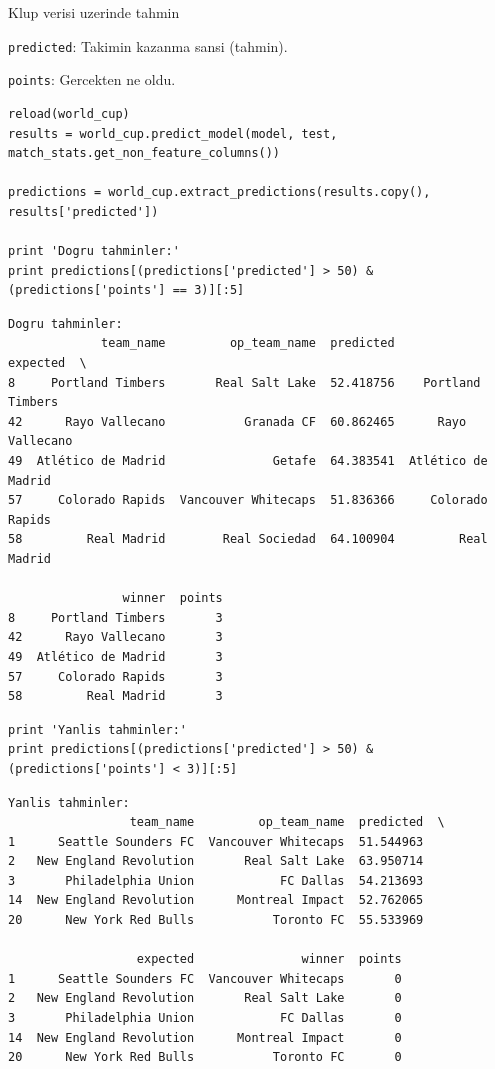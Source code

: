 \documentclass[12pt,fleqn]{article}\usepackage{../common}
\begin{document}
Klup verisi uzerinde tahmin

\verb!predicted!: Takimin kazanma sansi (tahmin).

\verb!points!: Gercekten ne oldu.

\begin{verbatim}
reload(world_cup)
results = world_cup.predict_model(model, test, match_stats.get_non_feature_columns())

predictions = world_cup.extract_predictions(results.copy(), results['predicted'])

print 'Dogru tahminler:'
print predictions[(predictions['predicted'] > 50) & (predictions['points'] == 3)][:5]
\end{verbatim}

\begin{verbatim}
Dogru tahminler:
             team_name         op_team_name  predicted            expected  \
8     Portland Timbers       Real Salt Lake  52.418756    Portland Timbers   
42      Rayo Vallecano           Granada CF  60.862465      Rayo Vallecano   
49  Atlético de Madrid               Getafe  64.383541  Atlético de Madrid   
57     Colorado Rapids  Vancouver Whitecaps  51.836366     Colorado Rapids   
58         Real Madrid        Real Sociedad  64.100904         Real Madrid   

                winner  points  
8     Portland Timbers       3  
42      Rayo Vallecano       3  
49  Atlético de Madrid       3  
57     Colorado Rapids       3  
58         Real Madrid       3  
\end{verbatim}

\begin{verbatim}
print 'Yanlis tahminler:'
print predictions[(predictions['predicted'] > 50) & (predictions['points'] < 3)][:5]
\end{verbatim}

\begin{verbatim}
Yanlis tahminler:
                 team_name         op_team_name  predicted  \
1      Seattle Sounders FC  Vancouver Whitecaps  51.544963   
2   New England Revolution       Real Salt Lake  63.950714   
3       Philadelphia Union            FC Dallas  54.213693   
14  New England Revolution      Montreal Impact  52.762065   
20      New York Red Bulls           Toronto FC  55.533969   

                  expected               winner  points  
1      Seattle Sounders FC  Vancouver Whitecaps       0  
2   New England Revolution       Real Salt Lake       0  
3       Philadelphia Union            FC Dallas       0  
14  New England Revolution      Montreal Impact       0  
20      New York Red Bulls           Toronto FC       0  
\end{verbatim}
\end{document}
